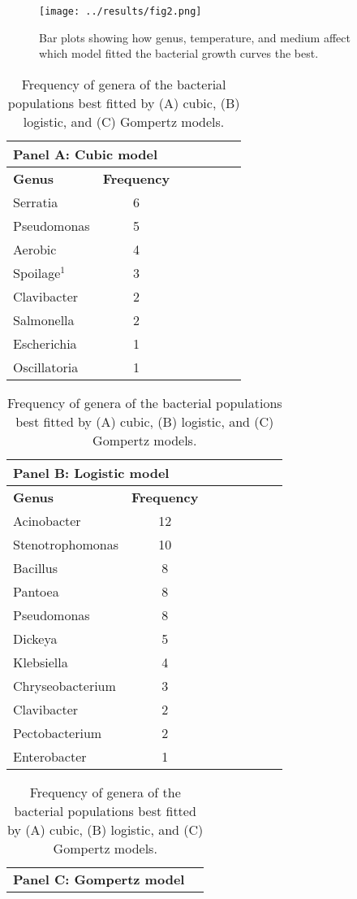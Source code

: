 \documentclass[11pt]{article}
\begin{document}
		\begin{figure}[htbp]
		\centering
		\texttt{[image: ../results/fig2.png]}
		\caption{Bar plots showing how genus, temperature, and medium affect which model fitted the bacterial growth curves the best.}
		\label{fig2}
	\end{figure}

	
	\begin{table}[htbp]
		\caption{Frequency of genera of the bacterial populations best fitted by (A) cubic, (B) logistic, and (C) Gompertz models.}
		\label{table2}
		\begin{tabularx}{\linewidth}{l*{6}{c}}
			\toprule
			\multicolumn{7}{l}{\textbf{Panel A: Cubic model}} \\
			\midrule
			\textbf{Genus} & \textbf{Frequency} \\
			Serratia & 6 \\
			Pseudomonas & 5 \\
			Aerobic & 4 \\
			Spoilage$^
			{1}$ & 3 \\
			Clavibacter & 2 \\
			Salmonella & 2 \\
			Escherichia & 1 \\
			Oscillatoria & 1 \\
			\bottomrule   
		\end{tabularx}
		\begin{tabularx}{\linewidth}{l*{7}{c}}
			\toprule
			\multicolumn{7}{l}{\textbf{Panel B: Logistic model}} \\
			\midrule
			\textbf{Genus} & \textbf{Frequency} \\
			Acinobacter & 12 \\
			Stenotrophomonas & 10 \\
			Bacillus & 8 \\
			Pantoea & 8 \\
			Pseudomonas & 8 \\
			Dickeya & 5 \\
			Klebsiella & 4 \\
			Chryseobacterium & 3 \\
			Clavibacter & 2 \\
			Pectobacterium & 2 \\
			Enterobacter & 1 \\
			\bottomrule
		\end{tabularx}
			\begin{tabularx}{\linewidth}{l*{7}{c}}
		\toprule
		\multicolumn{7}{l}{\textbf{Panel C: Gompertz model}} \\

\end{tabularx}
\end{table}
\end{document}
